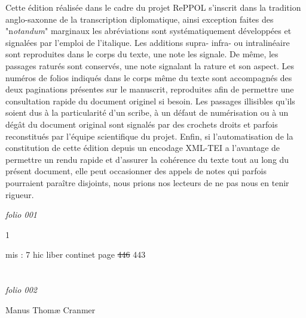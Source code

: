 \documentclass[12pt, a4paper]{book}
\begin{document}
Cette édition réalisée dans le cadre du projet RePPOL s'inscrit dans la tradition anglo-saxonne de la transcription diplomatique, ainsi exception faites des "n\textit{otandum}" marginaux les abréviations sont systématiquement développées et signalées par l'emploi de l'italique. Les additions supra- infra- ou intralinéaire sont reproduites dans le corps du texte, une note les signale. De même, les passages raturés sont conservés, une note signalant la rature et son aspect. Les numéros de folios indiqués dans le corps même du texte sont accompagnés des deux paginations présentes sur le manuscrit, reproduites afin de permettre une consultation rapide du document originel si besoin. Les passages illisibles qu'ils soient dus à la particularité d'un scribe, à un défaut de numérisation ou à un dégât du document original sont signalés par des crochets droits et parfois reconstitués par l'équipe scientifique du projet.
Enfin, si l'automatisation de la constitution de cette édition depuis un encodage XML-TEI a l'avantage de permettre un rendu rapide et d'assurer la cohérence du texte tout au long du présent document, elle peut occasionner des appels de notes qui parfois pourraient paraître disjoints, nous prions nos lecteurs de ne pas nous en tenir rigueur.
\tableofcontents
\newpage
{}

\textit{folio 001}
		
		 \begin{flushright}{\color{Mahogany}1}\end{flushright}
		
		\ifthenelse{\isodd{\thepage}}
		{\reversemarginpar}
		{\normalmarginpar}
		mis : 7 hic liber continet page \sout{446} 443

      	
\dotfill
					  \section*{}  \subsection*{}

\textit{folio 002}
			
            		
 				Manus Thomæ Cranmer
            		
\end{document}
